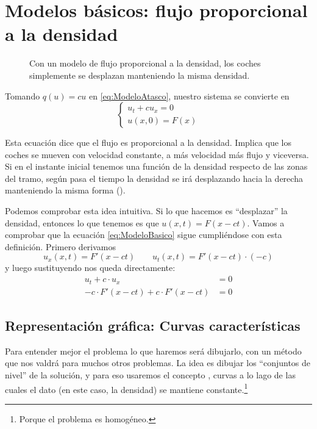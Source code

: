 	\section{Modelos básicos: flujo proporcional a la densidad}
	\label{sec:ModeloBasicoFlujoProporcional}

		\begin{figure}[hbtp]
		\centering
		\caption{Con un modelo de flujo proporcional a la densidad, los coches simplemente se desplazan manteniendo la misma densidad.}
		\label{fig:CochesModeloLineal}
		\end{figure}

		Tomando $q(u) = cu$ en \eqref{eq:ModeloAtasco}, nuestro sistema se convierte en
		\begin{equation}
		\left\{
		\begin{array}{l}
		u_t + cu_x = 0 \\
		u(x,0) = F(x)
		\end{array}
		\right. \label{eq:ModeloBasico}
		\end{equation}

		Esta ecuación dice que el flujo es proporcional a la densidad. Implica que los coches se mueven con velocidad constante, a más velocidad más flujo y viceversa. Si en el instante inicial tenemos una función de la densidad respecto de las zonas del tramo, según pasa el tiempo la densidad se irá desplazando hacia la derecha manteniendo la misma forma ().

		Podemos comprobar esta idea intuitiva. Si lo que hacemos es ``desplazar'' la densidad, entonces lo que tenemos es que $u(x,t) = F(x-ct)$. Vamos a comprobar que la ecuación \eqref{eq:ModeloBasico} sigue cumpliéndose con esta definición. Primero derivamos \[ u_x(x,t) = F'(x-ct) \qquad u_t(x,t) = F'(x-ct) · (-c) \] y luego sustituyendo nos queda directamente: \begin{align*}
			u_t + c·u_x &= 0 \\
			-c·F'(x-ct) + c·F'(x-ct) &= 0
		\end{align*}

		\subsection{Representación gráfica: Curvas características}

			Para entender mejor el problema lo que haremos será dibujarlo, con un método que nos valdrá para muchos otros problemas. La idea es dibujar los ``conjuntos de nivel'' de la solución, y para eso usaremos el concepto , curvas a lo lago de las cuales el dato (en este caso, la densidad) se mantiene constante.\footnote{Porque el problema es homogéneo.}

